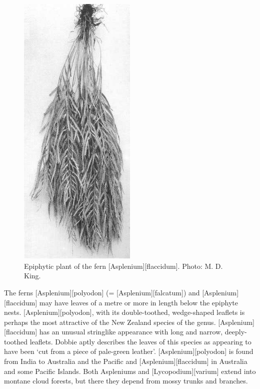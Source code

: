 \begin{figure}
	\includegraphics[width=0.5\textwidth]{graphics/figure43asplenium-jlaccidum.jpg}
	\centering
	\caption[Epiphytic plant of the fern \emph{Asplenium flaccidum}]{Epiphytic plant of the fern [Asplenium][flaccidum].
	Photo: M. D. King.}%
	\label{fig:43asplenium-jlaccidum}
\end{figure}

The ferns [Asplenium][polyodon] (= [Asplenium][falcatum]) and [Asplenium][flaccidum] may have leaves of a metre or more in length below the epiphyte nests. [Asplenium][polyodon], with its double-toothed, wedge-shaped leaflets is perhaps the most attractive of the New Zealand species of the genus. [Asplenium][flaccidum] has an unusual stringlike appearance with long and narrow, deeply-toothed leaflets.
Dobbie aptly describes the leaves of this species as appearing to have been `cut from a piece of pale-green leather'. [Asplenium][polyodon] is found from India to Australia and the Pacific and [Asplenium][flaccidum] in Australia and some Pacific Islands.
Both Aspleniums and [Lycopodium][varium] extend into montane cloud forests, but there they depend from mossy trunks and branches.

